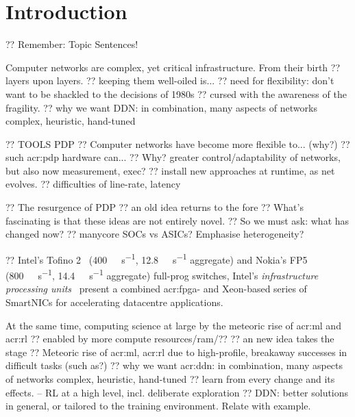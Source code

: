\chapter{Introduction}\label{chap:intro}


?? Remember: Topic Sentences!

Computer networks are complex, yet critical infrastructure.
From their birth 
?? layers upon layers.
?? keeping them well-oiled is...
?? need for flexibility: don't want to be shackled to the decisions of 1980s
?? cursed with the awareness of the fragility.
?? why we want DDN: in combination, many aspects of networks complex, heuristic, hand-tuned

?? TOOLS PDP
?? Computer networks have become more flexible to... (why?)
?? such \gls{acr:pdp} hardware can...
?? Why? greater control/adaptability of networks, but also now measurement, exec?
?? install new approaches at runtime, as net evolves.
?? difficulties of line-rate, latency

?? The resurgence of PDP
?? an old idea returns to the fore
?? What's fascinating is that these ideas are not entirely novel.
?? So we must ask: what has changed now?
?? manycore SOCs vs ASICs? Emphasise heterogeneity?

?? Intel's Tofino 2~\parencite{tofino2} (\qty{400}{\giga\bit\per\second}, \qty{12.8}{\tera\bit\per\second} aggregate) and Nokia's FP5~\parencite{nokia-fp5} (\qty{800}{\giga\bit\per\second}, \qty{14.4}{\tera\bit\per\second} aggregate) full-prog switches, Intel's \emph{infrastructure processing units}~\parencite{intel-ipu} present a combined \gls{acr:fpga}- and Xeon-based series of SmartNICs for accelerating datacentre applications.

At the same time, computing science at large by the meteoric rise of \gls{acr:ml} and \gls{acr:rl} ?? enabled by more compute resources/ram/??
?? an new idea takes the stage
?? Meteoric rise of \gls{acr:ml}, \gls{acr:rl} due to high-profile, breakaway successes in difficult tasks (such as?)
?? why we want \gls{acr:ddn}: in combination, many aspects of networks complex, heuristic, hand-tuned
?? learn from every change and its effects. -- RL at a high level, incl. deliberate exploration
?? DDN: better solutions in general, or tailored to the training environment. Relate with example.



